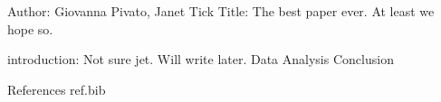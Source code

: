 Author: Giovanna Pivato, Janet Tick
Title: The best paper ever. At least we hope so.

introduction: Not sure jet. Will write later.
Data
Analysis
Conclusion

References
ref.bib
